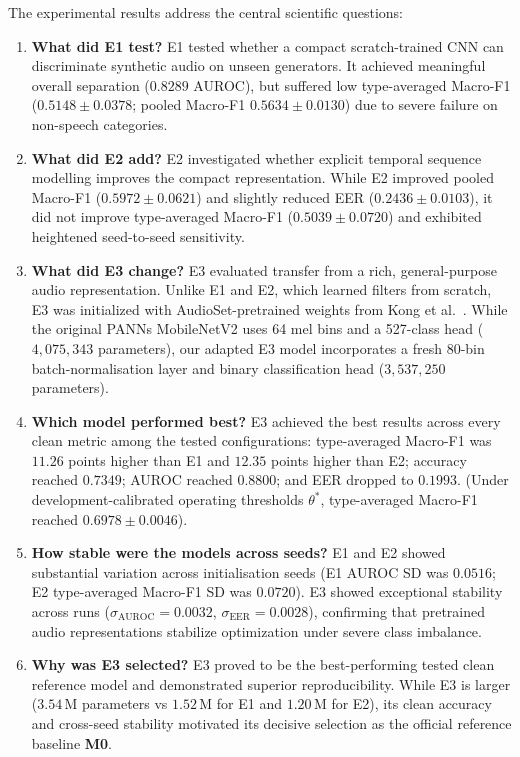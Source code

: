 \documentclass[12pt,a4paper]{report}
\begin{document}
The experimental results address the central scientific questions:
\begin{enumerate}[label=\textbf{\arabic*.},leftmargin=*,itemsep=0.2em]
  \item \textbf{What did E1 test?} E1 tested whether a compact scratch-trained CNN can discriminate synthetic audio on unseen generators. It achieved meaningful overall separation ($0.8289$ AUROC), but suffered low type-averaged Macro-F1 ($0.5148 \pm 0.0378$; pooled Macro-F1 $0.5634 \pm 0.0130$) due to severe failure on non-speech categories.
  \item \textbf{What did E2 add?} E2 investigated whether explicit temporal sequence modelling improves the compact representation. While E2 improved pooled Macro-F1 ($0.5972 \pm 0.0621$) and slightly reduced EER ($0.2436 \pm 0.0103$), it did not improve type-averaged Macro-F1 ($0.5039 \pm 0.0720$) and exhibited heightened seed-to-seed sensitivity.
  \item \textbf{What did E3 change?} E3 evaluated transfer from a rich, general-purpose audio representation. Unlike E1 and E2, which learned filters from scratch, E3 was initialized with AudioSet-pretrained weights from Kong et al.~\cite{kong2020panns}. While the original PANNs MobileNetV2 uses 64 mel bins and a 527-class head ($4{,}075{,}343$ parameters), our adapted E3 model incorporates a fresh 80-bin batch-normalisation layer and binary classification head ($3{,}537{,}250$ parameters).
  \item \textbf{Which model performed best?} E3 achieved the best results across every clean metric among the tested configurations: type-averaged Macro-F1 was $11.26$ points higher than E1 and $12.35$ points higher than E2; accuracy reached $0.7349$; AUROC reached $0.8800$; and EER dropped to $0.1993$. (Under development-calibrated operating thresholds $\theta^*$, type-averaged Macro-F1 reached $0.6978 \pm 0.0046$).
  \item \textbf{How stable were the models across seeds?} E1 and E2 showed substantial variation across initialisation seeds (E1 AUROC SD was $0.0516$; E2 type-averaged Macro-F1 SD was $0.0720$). E3 showed exceptional stability across runs ($\sigma_{\mathrm{AUROC}} = 0.0032$, $\sigma_{\mathrm{EER}} = 0.0028$), confirming that pretrained audio representations stabilize optimization under severe class imbalance.
  \item \textbf{Why was E3 selected?} E3 proved to be the best-performing tested clean reference model and demonstrated superior reproducibility. While E3 is larger ($3.54$\,M parameters vs $1.52$\,M for E1 and $1.20$\,M for E2), its clean accuracy and cross-seed stability motivated its decisive selection as the official reference baseline \textbf{M0}.
\end{enumerate}
\end{document}
